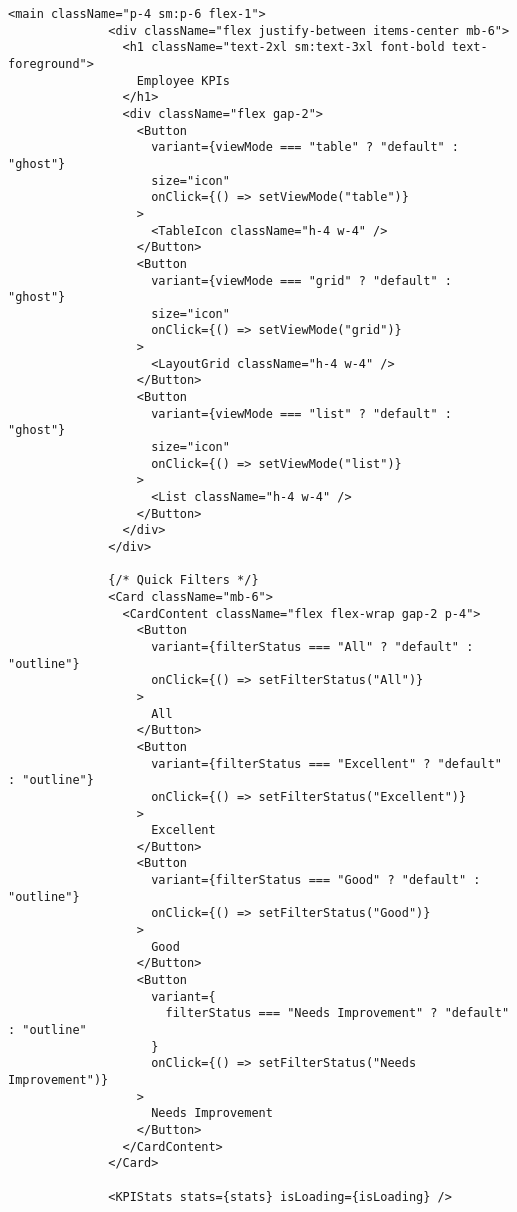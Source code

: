 \begin{lstlisting}[language=Golang, caption=Routes, frame=single]
            <main className="p-4 sm:p-6 flex-1">
              <div className="flex justify-between items-center mb-6">
                <h1 className="text-2xl sm:text-3xl font-bold text-foreground">
                  Employee KPIs
                </h1>
                <div className="flex gap-2">
                  <Button
                    variant={viewMode === "table" ? "default" : "ghost"}
                    size="icon"
                    onClick={() => setViewMode("table")}
                  >
                    <TableIcon className="h-4 w-4" />
                  </Button>
                  <Button
                    variant={viewMode === "grid" ? "default" : "ghost"}
                    size="icon"
                    onClick={() => setViewMode("grid")}
                  >
                    <LayoutGrid className="h-4 w-4" />
                  </Button>
                  <Button
                    variant={viewMode === "list" ? "default" : "ghost"}
                    size="icon"
                    onClick={() => setViewMode("list")}
                  >
                    <List className="h-4 w-4" />
                  </Button>
                </div>
              </div>
    
              {/* Quick Filters */}
              <Card className="mb-6">
                <CardContent className="flex flex-wrap gap-2 p-4">
                  <Button
                    variant={filterStatus === "All" ? "default" : "outline"}
                    onClick={() => setFilterStatus("All")}
                  >
                    All
                  </Button>
                  <Button
                    variant={filterStatus === "Excellent" ? "default" : "outline"}
                    onClick={() => setFilterStatus("Excellent")}
                  >
                    Excellent
                  </Button>
                  <Button
                    variant={filterStatus === "Good" ? "default" : "outline"}
                    onClick={() => setFilterStatus("Good")}
                  >
                    Good
                  </Button>
                  <Button
                    variant={
                      filterStatus === "Needs Improvement" ? "default" : "outline"
                    }
                    onClick={() => setFilterStatus("Needs Improvement")}
                  >
                    Needs Improvement
                  </Button>
                </CardContent>
              </Card>
    
              <KPIStats stats={stats} isLoading={isLoading} />
    

\end{lstlisting}
